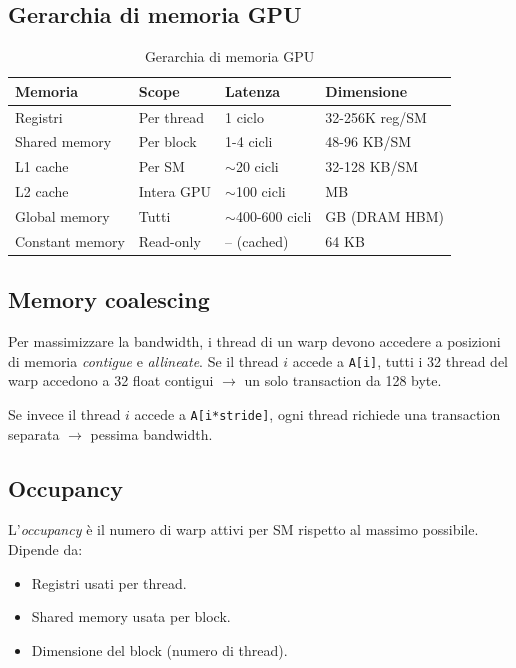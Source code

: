 \documentclass[11pt,a4paper]{article}
\theoremstyle{remark}
\begin{document}
\subsection{Gerarchia di memoria GPU}

\begin{table}[H]
\centering
\begin{tabular}{llll}
\toprule
Memoria & Scope & Latenza & Dimensione \\
\midrule
Registri & Per thread & 1 ciclo & 32-256K reg/SM \\
Shared memory & Per block & 1-4 cicli & 48-96 KB/SM \\
L1 cache & Per SM & $\sim$20 cicli & 32-128 KB/SM \\
L2 cache & Intera GPU & $\sim$100 cicli & MB \\
Global memory & Tutti & $\sim$400-600 cicli & GB (DRAM HBM) \\
Constant memory & Read-only & -- (cached) & 64 KB \\
\bottomrule
\end{tabular}
\caption{Gerarchia di memoria GPU}
\end{table}

\subsection{Memory coalescing}

Per massimizzare la bandwidth, i thread di un warp devono accedere a posizioni di memoria \emph{contigue} e \emph{allineate}. Se il thread $i$ accede a \texttt{A[i]}, tutti i 32 thread del warp accedono a 32 float contigui $\to$ un solo transaction da 128 byte.

Se invece il thread $i$ accede a \texttt{A[i*stride]}, ogni thread richiede una transaction separata $\to$ pessima bandwidth.

\subsection{Occupancy}

L'\emph{occupancy} è il numero di warp attivi per SM rispetto al massimo possibile. Dipende da:
\begin{itemize}
  \item Registri usati per thread.
  \item Shared memory usata per block.
  \item Dimensione del block (numero di thread).
\end{itemize}
\end{document}
